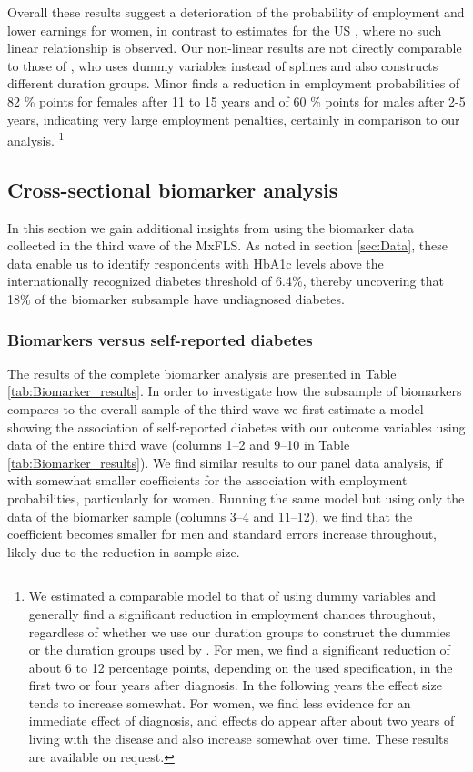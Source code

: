 \documentclass[12pt,english,british]{article}
\begin{document}
Overall these results suggest a deterioration of the probability of employment and lower earnings for women, in contrast to estimates for the US \citet{Minor2013}, where no such linear relationship is observed. Our non-linear results are not directly comparable to those of \citet{Minor2013}, who uses dummy variables instead of splines and also constructs different duration groups. Minor finds a reduction in employment probabilities of 82 \% points for females after 11 to 15 years and of 60 \% points for males after 2-5 years, indicating very large employment penalties, certainly in comparison to our analysis. \footnote{We estimated a comparable model to that of \citet{Minor2013} using dummy variables and generally find a significant reduction in employment chances throughout, regardless of whether we use our duration groups to construct the dummies or the duration groups used by \citet{Minor2013}. For men, we find a significant reduction of about 6 to 12 percentage points, depending on the used specification, in the first two or four years after diagnosis. In the following years the effect size tends to increase somewhat. For women, we find less evidence for an immediate effect of diagnosis, and  effects do appear after about two years of living with the disease and also increase somewhat over time. These results are available on request.}


\subsection{Cross-sectional biomarker analysis}


In this section we gain additional insights from using the biomarker data collected in the
third wave of the \ac{MxFLS}. As noted in section \ref{sec:Data}, these data enable us to identify respondents with
\ac{HbA1c} levels above the internationally recognized diabetes threshold of 6.4\%, thereby uncovering that 18\% of the biomarker subsample have undiagnosed diabetes. 



\subsubsection*{Biomarkers versus self-reported diabetes}


The results of the complete biomarker analysis are presented in Table \ref{tab:Biomarker_results}. In order to investigate how the subsample of biomarkers compares to the overall sample of the third wave we first estimate a model showing the association of self-reported diabetes with our outcome variables using data of the entire third wave (columns 1--2 and 9--10 in Table \ref{tab:Biomarker_results}). We find similar results to our panel data analysis, if with somewhat smaller coefficients for the association with employment probabilities, particularly for women. Running the same model but using only the data of the biomarker sample (columns 3--4 and 11--12), we find that the coefficient becomes smaller for men and standard errors increase throughout, likely due to the reduction in sample size.
\end{document}
